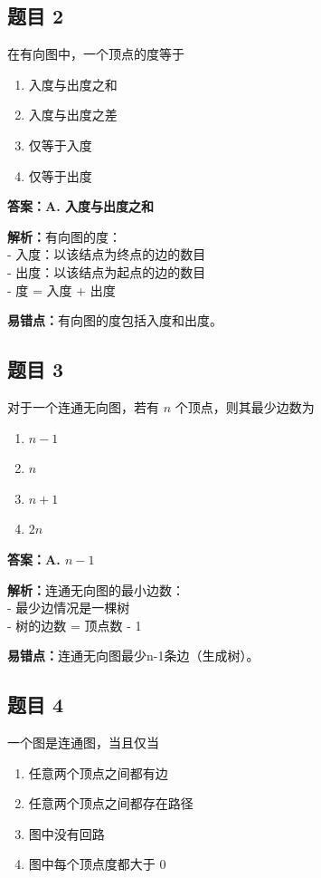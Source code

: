 \documentclass[12pt,a4paper]{ctexart}
\begin{document}
\subsection*{题目 2}
在有向图中，一个顶点的度等于
\begin{enumerate}[label=\Alph*.]
	\item 入度与出度之和
	\item 入度与出度之差
	\item 仅等于入度
	\item 仅等于出度
\end{enumerate}

\begin{answerbox}
	\textbf{答案：A. 入度与出度之和}

	\textbf{解析：}有向图的度：\\
	- 入度：以该结点为终点的边的数目\\
	- 出度：以该结点为起点的边的数目\\
	- 度 = 入度 + 出度

	\textbf{易错点：}有向图的度包括入度和出度。
\end{answerbox}

\subsection*{题目 3}
对于一个连通无向图，若有 $n$ 个顶点，则其最少边数为
\begin{enumerate}[label=\Alph*.]
	\item $n-1$
	\item $n$
	\item $n+1$
	\item $2n$
\end{enumerate}

\begin{answerbox}
	\textbf{答案：A. $n-1$}

	\textbf{解析：}连通无向图的最小边数：\\
	- 最少边情况是一棵树\\
	- 树的边数 = 顶点数 - 1

	\textbf{易错点：}连通无向图最少n-1条边（生成树）。
\end{answerbox}

\subsection*{题目 4}
一个图是连通图，当且仅当
\begin{enumerate}[label=\Alph*.]
	\item 任意两个顶点之间都有边
	\item 任意两个顶点之间都存在路径
	\item 图中没有回路
	\item 图中每个顶点度都大于 0
\end{enumerate}
\end{document}
